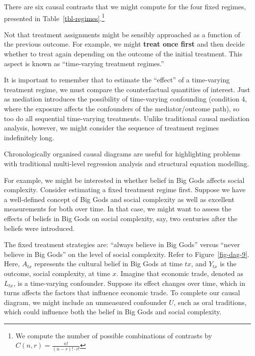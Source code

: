 \documentclass[
  singlecolumn]{report}
\begin{document}
There are six causal contrasts that we might compute for the four fixed
regimes, presented in Table~\ref{tbl-regimes}.\footnote{We compute the
  number of possible combinations of contrasts by
  \(C(n, r) = \frac{n!}{(n-r)! \cdot r!}\)}

Not that treatment assignments might be sensibly approached as a
function of the previous outcome. For example, we might \textbf{treat
once first} and then decide whether to treat again depending on the
outcome of the initial treatment. This aspect is known as ``time-varying
treatment regimes.''

It is important to remember that to estimate the ``effect'' of a
time-varying treatment regime, we must compare the counterfactual
quantities of interest. Just as mediation introduces the possibility of
time-varying confounding (condition 4, where the exposure affects the
confounders of the mediator/outcome path), so too do all sequential
time-varying treatments. Unlike traditional causal mediation analysis,
however, we might consider the sequence of treatment regimes
indefinitely long.

Chronologically organised causal diagrams are useful for highlighting
problems with traditional multi-level regression analysis and structural
equation modelling.

For example, we might be interested in whether belief in Big Gods
affects social complexity. Consider estimating a fixed treatment regime
first. Suppose we have a well-defined concept of Big Gods and social
complexity as well as excellent measurements for both over time. In that
case, we might want to assess the effects of beliefs in Big Gods on
social complexity, say, two centuries after the beliefs were introduced.

The fixed treatment strategies are: ``always believe in Big Gods''
versus ``never believe in Big Gods'' on the level of social complexity.
Refer to Figure~\ref{fig-dag-9}. Here, \(A_{tx}\) represents the
cultural belief in Big Gods at time \(tx\), and \(Y_{tx}\) is the
outcome, social complexity, at time \(x\). Imagine that economic trade,
denoted as \(L_{tx}\), is a time-varying confounder. Suppose its effect
changes over time, which in turns affects the factors that influence
economic trade. To complete our causal diagram, we might include an
unmeasured confounder \(U\), such as oral traditions, which could
influence both the belief in Big Gods and social complexity.
\end{document}

